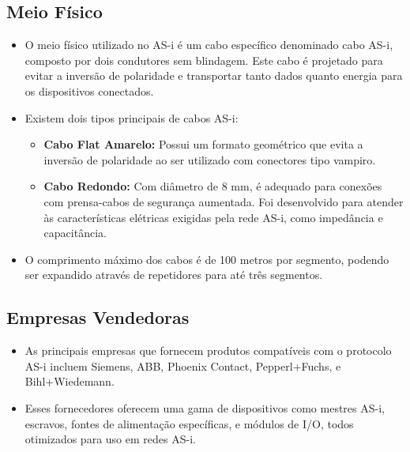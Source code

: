 \documentclass[a4paper,11pt]{article} %
\begin{document}
\subsection{Meio Físico}
\begin{itemize}
    \item O meio físico utilizado no AS-i é um cabo específico denominado cabo AS-i, composto por dois condutores sem blindagem. Este cabo é projetado para evitar a inversão de polaridade e transportar tanto dados quanto energia para os dispositivos conectados.
    \item Existem dois tipos principais de cabos AS-i:
    \begin{itemize}
        \item \textbf{Cabo Flat Amarelo:} Possui um formato geométrico que evita a inversão de polaridade ao ser utilizado com conectores tipo vampiro.
        \item \textbf{Cabo Redondo:} Com diâmetro de 8 mm, é adequado para conexões com prensa-cabos de segurança aumentada. Foi desenvolvido para atender às características elétricas exigidas pela rede AS-i, como impedância e capacitância.
    \end{itemize}
    \item O comprimento máximo dos cabos é de 100 metros por segmento, podendo ser expandido através de repetidores para até três segmentos.
\end{itemize}

\subsection{Empresas Vendedoras}
\begin{itemize}
    \item As principais empresas que fornecem produtos compatíveis com o protocolo AS-i incluem Siemens, ABB, Phoenix Contact, Pepperl+Fuchs, e Bihl+Wiedemann.
    \item Esses fornecedores oferecem uma gama de dispositivos como mestres AS-i, escravos, fontes de alimentação específicas, e módulos de I/O, todos otimizados para uso em redes AS-i.
\end{itemize}
\end{document}
